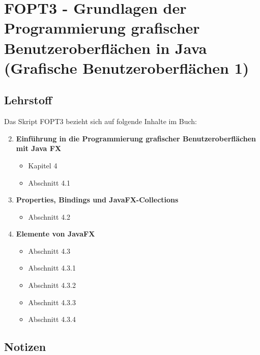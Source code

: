 
\chapter{FOPT3 - Grundlagen der Programmierung grafischer Benutzeroberflächen in Java (Grafische Benutzeroberflächen 1)}

\section{Lehrstoff}

Das Skript FOPT3 bezieht sich auf folgende Inhalte im Buch:

\begin{tcolorbox}[colback=white!20,color=white]
    \begin{enumerate}
        \setcounter{enumi}{1}
        \item \textbf{Einführung in die Programmierung grafischer Benutzeroberflächen mit Java FX}
        \begin{itemize}
            \item[] Kapitel 4
            \item[] Abschnitt 4.1
        \end{itemize}

        \item \textbf{Properties, Bindings und JavaFX-Collections}
        \begin{itemize}
            \item[] Abschnitt 4.2
        \end{itemize}

        \item \textbf{Elemente von JavaFX}
        \begin{itemize}
            \item[] Abschnitt 4.3
            \item[] Abschnitt 4.3.1
            \item[] Abschnitt 4.3.2
            \item[] Abschnitt 4.3.3
            \item[] Abschnitt 4.3.4
        \end{itemize}

    \end{enumerate}
\end{tcolorbox}

\newpage








\newpage
\section*{Notizen}

\newpage

